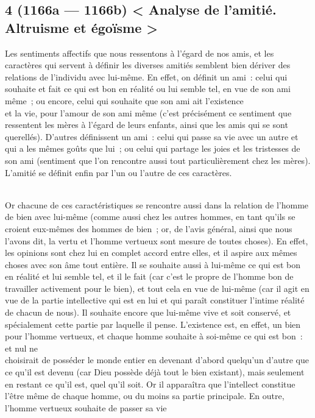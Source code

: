 \documentclass[french,twoside]{book} %
\begin{document}
\subsection[{4 (1166a — 1166b) < Analyse de l’amitié. Altruisme et égoïsme >}]{4 (1166a — 1166b) < Analyse de l’amitié. Altruisme et égoïsme >}
\noindent  Les sentiments affectifs que nous ressentons à l’égard de nos amis, et les caractères qui servent à définir les diverses amitiés semblent bien dériver des relations de l’individu avec lui-même. En effet, on définit un ami : celui qui souhaite et fait ce qui est bon en réalité ou lui semble tel, en vue de son ami même ; ou encore, celui qui souhaite que son ami ait l’existence \\
et la vie, pour l’amour de son ami même (c’est précisément ce sentiment que ressentent les mères à l’égard de leurs enfants, ainsi que les amis qui se sont querellés). D’autres définissent un ami : celui qui passe sa vie avec un autre et qui a les mêmes goûts que lui ; ou celui qui partage les joies et les tristesses de son ami (sentiment que l’on rencontre aussi tout particulièrement chez les mères). L’amitié se définit enfin par l’un ou l’autre de ces caractères.\par
\\
Or chacune de ces caractéristiques se rencontre aussi dans la relation de l’homme de bien avec lui-même (comme aussi chez les autres hommes, en tant qu’ils se croient eux-mêmes des hommes de bien ; or, de l’avis général, ainsi que nous l’avons dit, la vertu et l’homme vertueux sont mesure de toutes choses). En effet, les opinions sont chez lui en complet accord entre elles, et il aspire aux mêmes choses avec son âme tout entière. Il se souhaite aussi à lui-même ce qui est bon \\
en réalité et lui semble tel, et il le fait (car c’est le propre de l’homme bon de travailler activement pour le bien), et tout cela en vue de lui-même (car il agit en vue de la partie intellective qui est en lui et qui paraît constituer l’intime réalité de chacun de nous). Il souhaite encore que lui-même vive et soit conservé, et spécialement cette partie par laquelle il pense. L’existence est, en effet, un bien pour l’homme vertueux, et chaque homme souhaite à soi-même ce qui est bon : et nul ne \\
choisirait de posséder le monde entier en devenant d’abord quelqu’un d’autre que ce qu’il est devenu (car Dieu possède déjà tout le bien existant), mais seulement en restant ce qu’il est, quel qu’il soit. Or il apparaîtra que l’intellect constitue l’être même de chaque homme, ou du moins sa partie principale. En outre, l’homme vertueux souhaite de passer sa vie \\
\end{document}
